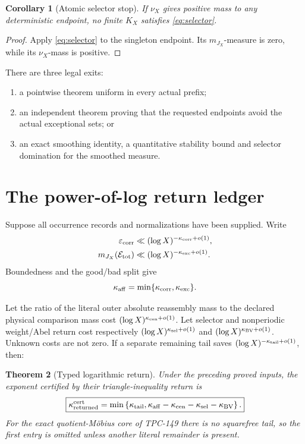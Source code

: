\documentclass[11pt]{article}
\newtheorem{theorem}{Theorem}[section]
\newtheorem{corollary}[theorem]{Corollary}
\theoremstyle{definition}
\theoremstyle{remark}
\begin{document}
\begin{corollary}[Atomic selector stop]
\label{cor:atomic}
If \(\nu_X\) gives positive mass to any deterministic endpoint, no
finite \(K_X\) satisfies \eqref{eq:selector}.
\end{corollary}

\begin{proof}
Apply \eqref{eq:selector} to the singleton endpoint.  Its
\(m_{J_X}\)-measure is zero, while its \(\nu_X\)-mass is positive.
\end{proof}

There are three legal exits:
\begin{enumerate}[label=(\roman*),leftmargin=2.2em]
\item a pointwise theorem uniform in every actual prefix;
\item an independent theorem proving that the requested endpoints
  avoid the actual exceptional sets; or
\item an exact smoothing identity, a quantitative stability bound
  and selector domination for the smoothed measure.
\end{enumerate}

\section{The power-of-log return ledger}

Suppose all occurrence records and normalizations have been supplied.
Write
\begin{align}
 \varepsilon_{\rm corr}
 &\ll(\log X)^{-\kappa_{\rm corr}+o(1)},\notag\\
 m_{J_X}(\mathcal E_{\rm tot})
 &\ll(\log X)^{-\kappa_{\rm exc}+o(1)}.
\label{eq:two-errors}
\end{align}
Boundedness and the good/bad split give
\begin{equation}
 \kappa_{\rm aff}
 =
 \min\{\kappa_{\rm corr},\kappa_{\rm exc}\}.
\label{eq:aff}
\end{equation}

Let the ratio of the literal outer absolute reassembly mass to the
declared physical comparison mass cost
\((\log X)^{\kappa_{\rm cen}+o(1)}\).  Let selector and nonperiodic
weight/Abel return cost respectively
\((\log X)^{\kappa_{\rm sel}+o(1)}\) and
\((\log X)^{\kappa_{\rm BV}+o(1)}\).  Unknown costs are not zero.
If a separate remaining tail saves
\((\log X)^{-\kappa_{\rm tail}+o(1)}\), then:

\begin{theorem}[Typed logarithmic return]
\label{thm:log-ledger}
Under the preceding proved inputs, the exponent certified by their
triangle-inequality return is
\begin{equation}
 \boxed{
 \kappa_{\rm returned}^{\rm cert}
 =
 \min\left\{
 \kappa_{\rm tail},
 \kappa_{\rm aff}
 -\kappa_{\rm cen}
 -\kappa_{\rm sel}
 -\kappa_{\rm BV}
 \right\}.}
\label{eq:log-ledger}
\end{equation}
For the exact quotient-M\"obius core of TPC-149 there is no
squarefree tail, so the first entry is omitted unless another literal
remainder is present.
\end{theorem}
\end{document}
